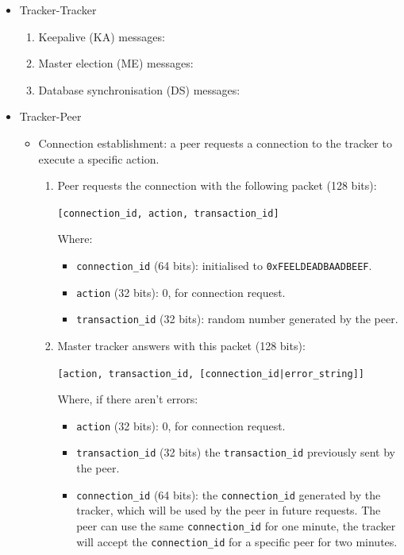 \documentclass[twoside,a4paper,10pt]{article}
\begin{document}
\begin{itemize}
\item Tracker-Tracker
  \begin{enumerate}
  \item Keepalive (KA) messages:
  \item Master election (ME) messages:
  \item Database synchronisation (DS) messages:
  \end{enumerate}
\item Tracker-Peer
  \begin{itemize}
  \item Connection establishment: a peer requests a connection to the tracker
    to execute a specific action.

    \begin{enumerate}
    \item Peer requests the connection with the following packet (128 bits):
      
      \texttt{[connection\_id, action, transaction\_id]}

      Where:
      \begin{itemize}
      \item \texttt{connection\_id} (64 bits): initialised to
        \texttt{0xFEELDEADBAADBEEF}.
      \item \texttt{action} (32 bits): 0, for connection request.
      \item \texttt{transaction\_id} (32 bits): random number generated by the
        peer.
      \end{itemize}
    \item Master tracker answers with this packet (128 bits):

      \texttt{[action, transaction\_id, [connection\_id|error\_string]]}

      Where, if there aren't errors:
      \begin{itemize}
      \item \texttt{action} (32 bits): 0, for connection request.
      \item \texttt{transaction\_id} (32 bits)
        the \texttt{transaction\_id} previously sent by the peer.
      \item \texttt{connection\_id} (64 bits):
        the \texttt{connection\_id} generated by the tracker, which will be used
        by the peer in future requests. The peer can use the same
        \texttt{connection\_id} for one minute, the tracker will accept the
        \texttt{connection\_id} for a specific peer for two minutes.
      \end{itemize}


\end{enumerate}
\end{itemize}
\end{itemize}
\end{document}
